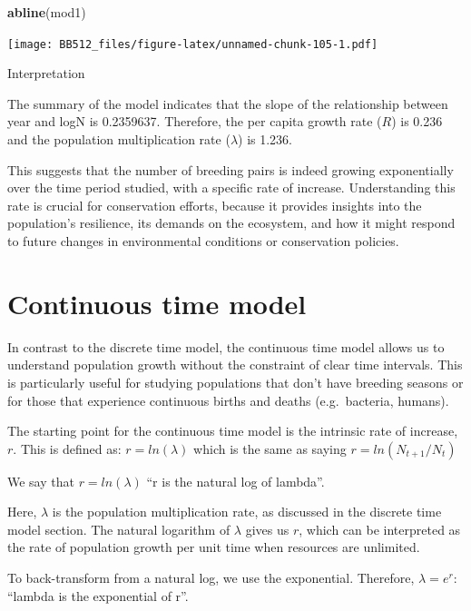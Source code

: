 \documentclass[
  a4paper]{book}
\newenvironment{Shaded}{\begin{snugshade}}{\end{snugshade}}
\newcommand{\FunctionTok}[1]{\textcolor[rgb]{0.13,0.29,0.53}{\textbf{#1}}}
\newcommand{\NormalTok}[1]{#1}
\begin{document}
\begin{Shaded}
\begin{Highlighting}[]
\FunctionTok{abline}\NormalTok{(mod1)}
\end{Highlighting}
\end{Shaded}

\texttt{[image: BB512\_files/figure-latex/unnamed-chunk-105-1.pdf]}

Interpretation

The summary of the model indicates that the slope of the relationship between year and logN is 0.2359637. Therefore, the per capita growth rate (\(R\)) is 0.236 and the population multiplication rate (\(\lambda\)) is 1.236.

This suggests that the number of breeding pairs is indeed growing exponentially over the time period studied, with a specific rate of increase. Understanding this rate is crucial for conservation efforts, because it provides insights into the population's resilience, its demands on the ecosystem, and how it might respond to future changes in environmental conditions or conservation policies.

\hypertarget{continuous-time-model}{%
\section{Continuous time model}\label{continuous-time-model}}

In contrast to the discrete time model, the continuous time model allows us to understand population growth without the constraint of clear time intervals. This is particularly useful for studying populations that don't have breeding seasons or for those that experience continuous births and deaths (e.g.~bacteria, humans).

The starting point for the continuous time model is the intrinsic rate of increase, \(r\). This is defined as: \(r = ln(\lambda)\) which is the same as saying \(r = ln(N_{t+1}/N_t)\)

We say that \(r = ln(\lambda)\) ``r is the natural log of lambda''.

Here, \(\lambda\) is the population multiplication rate, as discussed in the discrete time model section. The natural logarithm of \(\lambda\) gives us \(r\), which can be interpreted as the rate of population growth per unit time when resources are unlimited.

To back-transform from a natural log, we use the exponential. Therefore, \(\lambda = e^r\): ``lambda is the exponential of r''.
\end{document}
